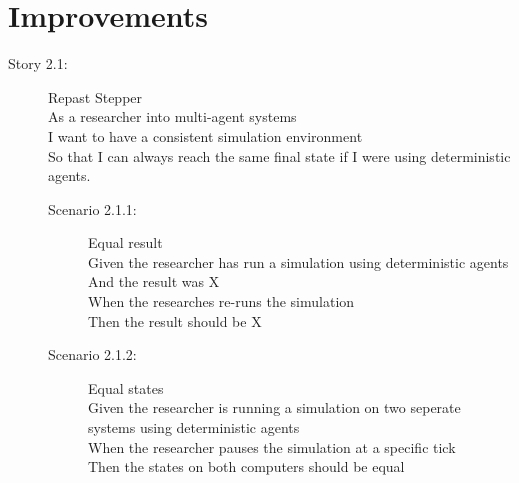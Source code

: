 \documentclass{article}
\begin{document}
\section{Improvements}
    \begin{description}
    \item[Story 2.1:] Repast Stepper\\
    As a researcher into multi-agent systems\\
    I want to have a consistent simulation environment\\
    So that I can always reach the same final state if I were using deterministic agents.
    
        \begin{description}
        \item[Scenario 2.1.1:] Equal result\\
        Given the researcher has run a simulation using deterministic agents\\
        And the result was X\\
        When the researches re-runs the simulation\\
        Then the result should be X
        
        \item[Scenario 2.1.2:] Equal states\\
        Given the researcher is running a simulation on two seperate systems using deterministic agents\\
        When the researcher pauses the simulation at a specific tick\\
        Then the states on both computers should be equal
    \end{description}
\end{description}
\end{document}

